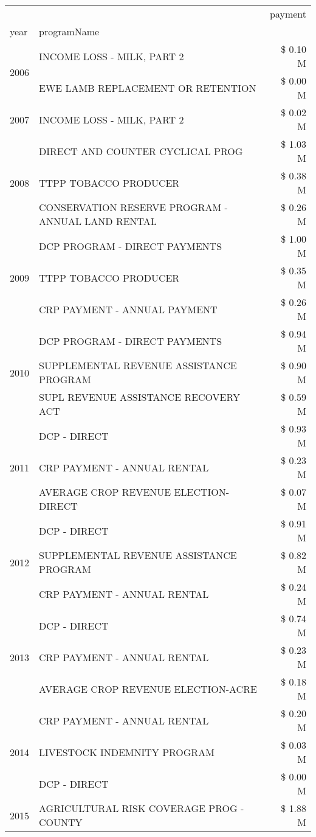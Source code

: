 \begin{tabular}{llr}
\toprule
 &  & payment \\
year & programName &  \\
\midrule
\multirow[t]{2}{*}{2006} & INCOME LOSS - MILK, PART 2 & \$ 0.10 M \\
 & EWE LAMB REPLACEMENT OR RETENTION & \$ 0.00 M \\
\cline{1-3}
2007 & INCOME LOSS - MILK, PART 2 & \$ 0.02 M \\
\cline{1-3}
\multirow[t]{3}{*}{2008} & DIRECT AND COUNTER CYCLICAL PROG & \$ 1.03 M \\
 & TTPP TOBACCO PRODUCER & \$ 0.38 M \\
 & CONSERVATION RESERVE PROGRAM - ANNUAL LAND RENTAL & \$ 0.26 M \\
\cline{1-3}
\multirow[t]{3}{*}{2009} & DCP PROGRAM - DIRECT PAYMENTS & \$ 1.00 M \\
 & TTPP TOBACCO PRODUCER & \$ 0.35 M \\
 & CRP PAYMENT - ANNUAL PAYMENT & \$ 0.26 M \\
\cline{1-3}
\multirow[t]{3}{*}{2010} & DCP PROGRAM - DIRECT PAYMENTS & \$ 0.94 M \\
 & SUPPLEMENTAL REVENUE ASSISTANCE PROGRAM & \$ 0.90 M \\
 & SUPL REVENUE ASSISTANCE RECOVERY ACT & \$ 0.59 M \\
\cline{1-3}
\multirow[t]{3}{*}{2011} & DCP - DIRECT & \$ 0.93 M \\
 & CRP PAYMENT - ANNUAL RENTAL & \$ 0.23 M \\
 & AVERAGE CROP REVENUE ELECTION-DIRECT & \$ 0.07 M \\
\cline{1-3}
\multirow[t]{3}{*}{2012} & DCP - DIRECT & \$ 0.91 M \\
 & SUPPLEMENTAL REVENUE ASSISTANCE PROGRAM & \$ 0.82 M \\
 & CRP PAYMENT - ANNUAL RENTAL & \$ 0.24 M \\
\cline{1-3}
\multirow[t]{3}{*}{2013} & DCP - DIRECT & \$ 0.74 M \\
 & CRP PAYMENT - ANNUAL RENTAL & \$ 0.23 M \\
 & AVERAGE CROP REVENUE ELECTION-ACRE & \$ 0.18 M \\
\cline{1-3}
\multirow[t]{3}{*}{2014} & CRP PAYMENT - ANNUAL RENTAL & \$ 0.20 M \\
 & LIVESTOCK INDEMNITY PROGRAM & \$ 0.03 M \\
 & DCP - DIRECT & \$ 0.00 M \\
\cline{1-3}
\multirow[t]{3}{*}{2015} & AGRICULTURAL RISK COVERAGE PROG - COUNTY & \$ 1.88 M \\

\end{tabular}
